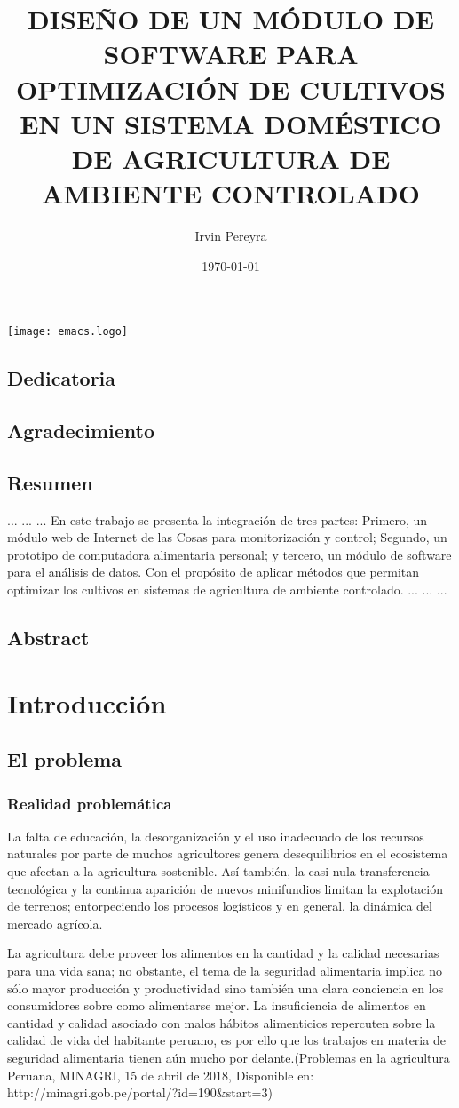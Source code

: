\documentclass{report}
\title{DISEÑO DE UN MÓDULO DE SOFTWARE PARA OPTIMIZACIÓN DE CULTIVOS EN UN
  SISTEMA DOMÉSTICO DE AGRICULTURA DE AMBIENTE CONTROLADO}
\author{Irvin Pereyra}
\date{\today}
\begin{document}
\maketitle
\texttt{[image: emacs.logo]}
\section{Dedicatoria}
\section{Agradecimiento}
\tableofcontents
\newpage
{}
\section{Resumen}
...
...
...
En este trabajo se presenta la integración de tres partes: Primero, un
módulo web de Internet de las Cosas para monitorización y control; Segundo, un
prototipo de computadora alimentaria personal; y tercero, un módulo de software
para el análisis de datos. Con el propósito de aplicar métodos que permitan
optimizar los cultivos en sistemas de agricultura de ambiente controlado.
...
...
...
\section{Abstract}

\chapter{Introducción}
\section{El problema}
\subsection{Realidad problemática}
La falta de educación, la desorganización y el uso inadecuado de los recursos
naturales por parte de muchos agricultores genera desequilibrios en el
ecosistema que afectan a la agricultura sostenible. Así también, la casi nula
transferencia tecnológica y la continua aparición de nuevos minifundios limitan
la explotación de terrenos; entorpeciendo los procesos logísticos y en general,
la dinámica del mercado agrícola.

La agricultura debe proveer los alimentos en la cantidad y la calidad necesarias
para una vida sana; no obstante, el tema de la seguridad alimentaria implica no
sólo mayor producción y productividad sino también una clara conciencia en los
consumidores sobre como alimentarse mejor. La insuficiencia de alimentos en
cantidad y calidad asociado con malos hábitos alimenticios repercuten sobre la
calidad de vida del habitante peruano, es por ello que los trabajos en materia
de seguridad alimentaria tienen aún mucho por delante.(Problemas en la
agricultura Peruana, MINAGRI, 15 de abril de 2018,  Disponible en:
http://minagri.gob.pe/portal/?id=190&start=3)
\end{document}
